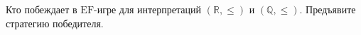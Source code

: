 Кто побеждает в $\mathrm{EF}$-игре для интерпретаций $(\mathbb{R}, \le)$ и $(\mathbb{Q}, \le)$.
Предъявите стратегию победителя.